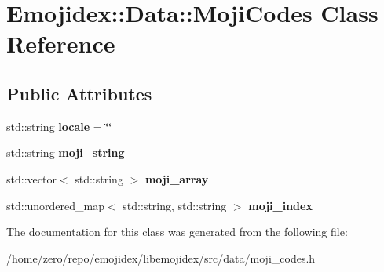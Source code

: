 \hypertarget{classEmojidex_1_1Data_1_1MojiCodes}{}\section{Emojidex\+:\+:Data\+:\+:Moji\+Codes Class Reference}
\label{classEmojidex_1_1Data_1_1MojiCodes}
\subsection*{Public Attributes}
\begin{DoxyCompactItemize}
\item 
std\+::string {\bfseries locale} = \char`\"{}\char`\"{}\hypertarget{classEmojidex_1_1Data_1_1MojiCodes_a30264352b96dfd99ff288c1669a999cc}{}\label{classEmojidex_1_1Data_1_1MojiCodes_a30264352b96dfd99ff288c1669a999cc}

\item 
std\+::string {\bfseries moji\+\_\+string}\hypertarget{classEmojidex_1_1Data_1_1MojiCodes_af3d498cd68c0dad96394096631a871ce}{}\label{classEmojidex_1_1Data_1_1MojiCodes_af3d498cd68c0dad96394096631a871ce}

\item 
std\+::vector$<$ std\+::string $>$ {\bfseries moji\+\_\+array}\hypertarget{classEmojidex_1_1Data_1_1MojiCodes_a0847d05256542ad50fa8f3b48bf76853}{}\label{classEmojidex_1_1Data_1_1MojiCodes_a0847d05256542ad50fa8f3b48bf76853}

\item 
std\+::unordered\+\_\+map$<$ std\+::string, std\+::string $>$ {\bfseries moji\+\_\+index}\hypertarget{classEmojidex_1_1Data_1_1MojiCodes_adaa77850c0d3d456c268a15e0f92e3ec}{}\label{classEmojidex_1_1Data_1_1MojiCodes_adaa77850c0d3d456c268a15e0f92e3ec}

\end{DoxyCompactItemize}


The documentation for this class was generated from the following file\+:\begin{DoxyCompactItemize}
\item 
/home/zero/repo/emojidex/libemojidex/src/data/moji\+\_\+codes.\+h\end{DoxyCompactItemize}
